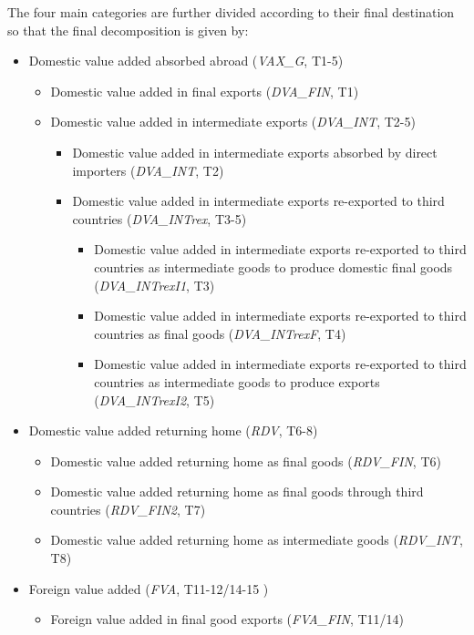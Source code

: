 \documentclass[11pt,a4paper]{article}
\begin{document}
The four main categories are further divided according to their final destination so that the final decomposition is given by:

\begin{itemize}
\item Domestic value added absorbed abroad (\textit{VAX\_G}, T1-5)
\begin{itemize}
\item Domestic value added in final exports (\textit{DVA\_FIN}, T1)
\item Domestic value added in intermediate exports (\textit{DVA\_INT}, T2-5)
\begin{itemize}
\item Domestic value added in intermediate exports absorbed by direct importers (\textit{DVA\_INT}, T2)
\item Domestic value added in intermediate exports re-exported to third countries (\textit{DVA\_INTrex}, T3-5)
\begin{itemize}
\item Domestic value added in intermediate exports re-exported to third countries as intermediate goods to produce domestic final goods (\textit{DVA\_INTrexI1}, T3)
\item Domestic value added in intermediate exports re-exported to third countries as  final goods (\textit{DVA\_INTrexF}, T4)
\item Domestic value added in intermediate exports re-exported to third countries as intermediate goods to produce exports (\textit{DVA\_INTrexI2}, T5)
\end{itemize}
\end{itemize}
\end{itemize}
\item Domestic value added returning home (\textit{RDV}, T6-8)
\begin{itemize}
\item Domestic value added returning home as final goods (\textit{RDV\_FIN}, T6)
\item Domestic value added returning home as final goods through third countries (\textit{RDV\_FIN2}, T7)
\item Domestic value added returning home as intermediate goods (\textit{RDV\_INT}, T8)
\end{itemize}
\item Foreign value added (\textit{FVA}, T11-12/14-15 )
\begin{itemize}
\item Foreign value added in final good exports (\textit{FVA\_FIN}, T11/14)

\end{itemize}
\end{itemize}
\end{document}
